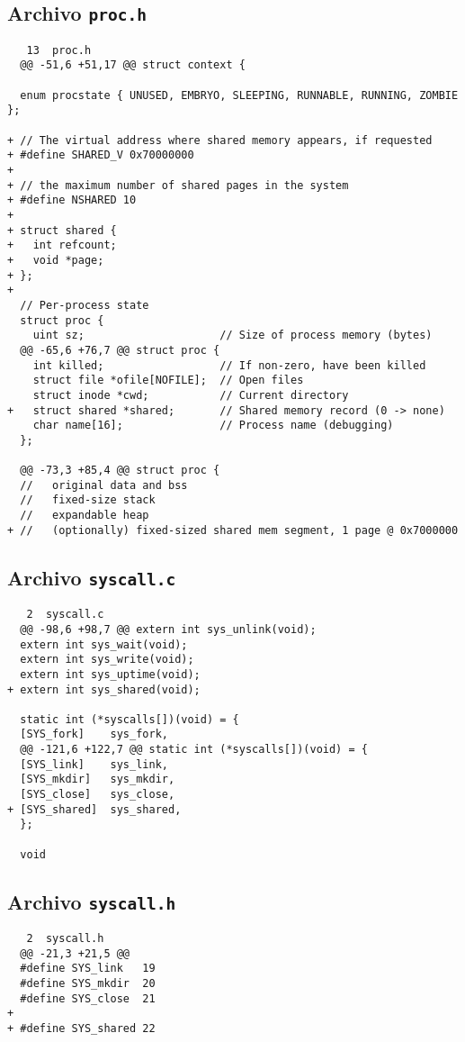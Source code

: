 \documentclass[12pt]{article}
\begin{document}
\subsection{Archivo {\tt proc.h}}
\begin{verbatim}
   13  proc.h 
  @@ -51,6 +51,17 @@ struct context {
  
  enum procstate { UNUSED, EMBRYO, SLEEPING, RUNNABLE, RUNNING, ZOMBIE };
  
+ // The virtual address where shared memory appears, if requested
+ #define SHARED_V 0x70000000
+ 
+ // the maximum number of shared pages in the system
+ #define NSHARED 10
+ 
+ struct shared {
+   int refcount;
+   void *page; 
+ };
+ 
  // Per-process state
  struct proc {
    uint sz;                     // Size of process memory (bytes)
  @@ -65,6 +76,7 @@ struct proc {
    int killed;                  // If non-zero, have been killed
    struct file *ofile[NOFILE];  // Open files
    struct inode *cwd;           // Current directory
+   struct shared *shared;       // Shared memory record (0 -> none)
    char name[16];               // Process name (debugging)
  };
  
  @@ -73,3 +85,4 @@ struct proc {
  //   original data and bss
  //   fixed-size stack
  //   expandable heap
+ //   (optionally) fixed-sized shared mem segment, 1 page @ 0x7000000
\end{verbatim}
\subsection{Archivo {\tt syscall.c}}
\begin{verbatim}
   2  syscall.c 
  @@ -98,6 +98,7 @@ extern int sys_unlink(void);
  extern int sys_wait(void);
  extern int sys_write(void);
  extern int sys_uptime(void);
+ extern int sys_shared(void);
  
  static int (*syscalls[])(void) = {
  [SYS_fork]    sys_fork,
  @@ -121,6 +122,7 @@ static int (*syscalls[])(void) = {
  [SYS_link]    sys_link,
  [SYS_mkdir]   sys_mkdir,
  [SYS_close]   sys_close,
+ [SYS_shared]  sys_shared,
  };
  
  void
\end{verbatim}
\subsection{Archivo {\tt syscall.h}}
\begin{verbatim}
   2  syscall.h 
  @@ -21,3 +21,5 @@
  #define SYS_link   19
  #define SYS_mkdir  20
  #define SYS_close  21
+ 
+ #define SYS_shared 22
\end{verbatim}
\end{document}
